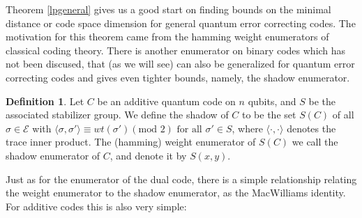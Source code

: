 \documentclass{article}
\def\E{\mathcal{E}}
\def\fa{\text{ for all }}
\theoremstyle{definition}
\newtheorem{defn}[Satz]{Definition}
\begin{document}
Theorem \ref{lpgeneral} gives us a good start on finding bounds on the minimal distance or code space dimension for general quantum error correcting codes.
The motivation for this theorem came from the hamming weight enumerators of classical coding theory. There is another enumerator on binary codes which has not been discused, that (as we will see) can also be generalized for quantum error correcting codes and gives even tighter bounds, namely, the shadow enumerator.

\begin{defn}
Let $C$ be an additive quantum code on $n$ qubits, and $S$ be the associated stabilizer group. We define the shadow of $C$ to be the set $S(C)$ of all $\sigma \in \E$ with $\langle \sigma, \sigma' \rangle \equiv wt(\sigma') (\text{mod }2) \fa \sigma' \in S$, where $\langle \cdot , \cdot \rangle$ denotes the trace inner product.
The (hamming) weight enumerator of $S(C)$ we call the shadow enumerator of $C$, and denote it by $S(x,y)$.
\end{defn}

Just as for the enumerator of the dual code, there is a simple relationship relating the weight enumerator to the shadow enumerator, as the MacWilliams identity. For additive codes this is also very simple:
\end{document}
